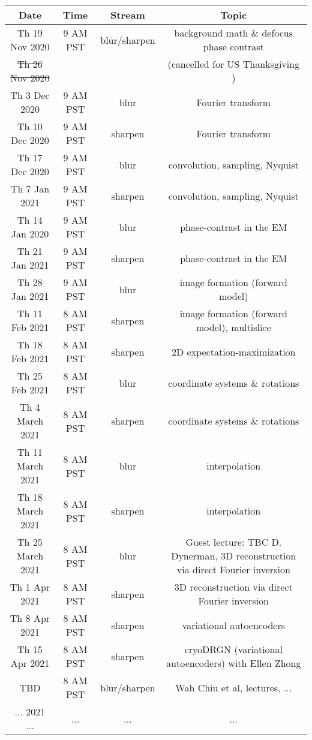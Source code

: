 \documentclass[11pt, oneside]{article}   	%
\begin{document}
\begin{center}
\small
 \begin{tabular}{|| c c c c||} 
 \hline
 Date & Time & Stream & Topic \\ [0.5ex] 
 \hline\hline
Th 19 Nov 2020 & \tiny{9 AM PST} &  blur/sharpen & background math \& defocus phase contrast  \\ 
 \hline
\sout{Th 26 Nov 2020}  &   & & (cancelled for US Thanksgiving )    \\ 
 \hline
Th 3 Dec 2020 & \tiny{9 AM PST} & blur & Fourier transform   \\ 
 \hline
Th 10 Dec 2020 & \tiny{9 AM PST} & sharpen & Fourier transform   \\ 
 \hline
Th 17 Dec 2020 & \tiny{9 AM PST} & blur & convolution, sampling, Nyquist   \\ 
 \hline
Th 7 Jan 2021 & \tiny{9 AM PST} & sharpen & convolution, sampling, Nyquist   \\ 
 \hline
Th 14 Jan 2020 & \tiny{9 AM PST} & blur & phase-contrast in the EM   \\ 
 \hline
Th 21 Jan 2021 & \tiny{9 AM PST} & sharpen & phase-contrast in the EM   \\ 
 \hline
Th 28 Jan 2021 & \tiny{9 AM PST} & blur & image formation (forward model)   \\ 
 \hline
Th 11 Feb 2021 & \tiny{8 AM PST} & sharpen & image formation (forward model), multislice   \\ 
 \hline
Th 18 Feb 2021 & \tiny{8 AM PST} & sharpen &  2D expectation-maximization \\ 
 \hline
Th 25 Feb 2021 & \tiny{8 AM PST} & blur & coordinate systems \& rotations  \\ 
 \hline
 Th 4 March 2021 & \tiny{8 AM PST} & sharpen & coordinate systems \& rotations  \\ 
 \hline
Th 11 March 2021 & \tiny{8 AM PST} & blur & interpolation  \\ 
 \hline
 Th 18 March 2021 & \tiny{8 AM PST} & sharpen & interpolation  \\ 
 \hline
Th 25 March 2021 & \tiny{8 AM PST} & blur & \tiny{Guest lecture: TBC D. Dynerman, 3D reconstruction via direct Fourier inversion}  \\ 
 \hline
 Th 1 Apr 2021 & \tiny{8 AM PST} & sharpen & \tiny{3D reconstruction via direct Fourier inversion}  \\ 
 \hline
Th 8 Apr 2021 & \tiny{8 AM PST} & sharpen & variational autoencoders  \\ 
 \hline
Th 15 Apr 2021 & \tiny{8 AM PST} & sharpen & cryoDRGN (variational autoencoders) with Ellen Zhong  \\ 
 \hline
TBD & \tiny{8 AM PST} & blur/sharpen & Wah Chiu et al, lectures, ...  \\ [1ex] 
 \hline
 ... 2021 ... & ... &  ... & ...  \\ 
 \hline
\end{tabular}
\end{center}
\end{document}
